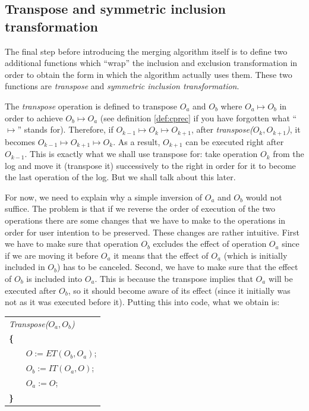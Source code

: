 \subsection{Transpose and symmetric inclusion transformation}
\label{sec:transp}

The final step before introducing the merging algorithm itself is to define two additional
functions which ``wrap'' the inclusion and exclusion transformation in order to obtain
the form in which the algorithm actually uses them. These two functions are \emph{transpose}
and \emph{symmetric inclusion transformation}.

The \emph{transpose} operation is defined to transpose $O_{a}$ and $O_{b}$ where $O_{a} \mapsto
O_{b}$ in order to achieve $O_{b} \mapsto O_{a}$ (see definition \ref{def:cprec} if you have
forgotten what ``$\mapsto$'' stands for). Therefore, if $O_{k-1} \mapsto O_{k} \mapsto
O_{k+1}$, after \emph{transpose($O_{k},O_{k+1}$)}, it becomes $O_{k-1} \mapsto O_{k+1} \mapsto
O_{k}$. As a result, $O_{k+1}$ can be executed right after $O_{k-1}$. This is exactly what
we shall use transpose for: take operation $O_{k}$ from the log and move it (transpose it)
successively to the right in order for it to become the last operation of the log. But we
shall talk about this later.

For now, we need to explain why a simple inversion of $O_{a}$ and $O_{b}$ would not suffice.
The problem is that if we reverse the order of execution of the two operations there are
some changes that we have to make to the operations in order for user intention to be preserved.
These changes are rather intuitive. First we have to make sure that operation $O_{b}$
excludes the effect of operation $O_{a}$ since if we are moving it before $O_{a}$ it means
that the effect of $O_{a}$ (which is initially included in $O_{b}$) has to be canceled.
Second, we have to make sure that the effect of $O_{b}$ is included into $O_{a}$. This is
because the transpose implies that $O_{a}$ will be executed after $O_{b}$, so it should
become aware of its effect (since it initially was not as it was executed before it).
Putting this into code, what we obtain is:

\begin{center}
\begin{tabular}[c]{|l|}
\hline
\emph{Transpose($O_{a},O_{b}$)}\\
\textbf{\{}\\
\verb+    +$O := ET(O_{b},O_{a})$;\\
\verb+    +$O_{b} := IT(O_{a},O)$;\\
\verb+    +$O_{a} := O$;\\
\textbf{\}}\\
\hline
\end{tabular}
\end{center}

